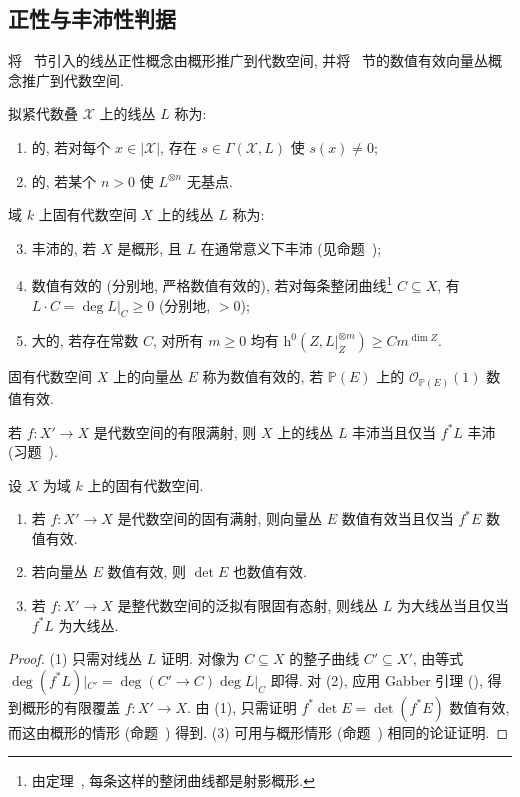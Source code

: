 \subsection{正性与丰沛性判据}\label{src:6.9.2-subsection}
将~ 节引入的线丛正性概念由概形推广到代数空间, 并将~ 节的数值有效向量丛概念推广到代数空间.
\begin{definition}\label{src:6.9.7}
拟紧代数叠 $\mathcal X$ 上的线丛 $L$ 称为:
\begin{enumerate}[(1)]
\item {}的, 若对每个 $x\in|\mathcal X|$, 存在 $s\in\Gamma(\mathcal X,\allowbreak L)$ 使 $s(x)\ne0$;
\item {}的, 若某个 $n>0$ 使 $L^{\otimes n}$ 无基点.
\end{enumerate}
域 $k$ 上固有代数空间 $X$ 上的线丛 $L$ 称为:
\begin{enumerate}[(1)]\setcounter{enumi}{2}
\item 丰沛的, 若 $X$ 是概形, 且 $L$ 在通常意义下丰沛 (见命题~);
\item 数值有效的 (分别地, 严格数值有效的), 若对每条整闭曲线\footnote{由定理~, 每条这样的整闭曲线都是射影概形.} $C\subseteq X$, 有 $L\cdot C=\deg L|_C\geq0$ (分别地, $>0$);
\item 大的, 若存在常数 $C$, 对所有 $m\geq0$ 均有 $\mathrm h^0(Z,\allowbreak L|_Z^{\otimes m})\geq Cm^{\dim Z}$.
\end{enumerate}
固有代数空间 $X$ 上的向量丛 $E$ 称为数值有效的, 若 $\mathbb P(E)$ 上的 $\mathcal O_{\mathbb P(E)}(1)$ 数值有效.
\end{definition}
若 $f:X'\to\allowbreak X$ 是代数空间的有限满射, 则 $X$ 上的线丛 $L$ 丰沛当且仅当 $f^*L$ 丰沛 (习题~).
\begin{lemma}\label{src:6.9.8}
设 $X$ 为域 $k$ 上的固有代数空间.
\begin{enumerate}[(1)]
\item 若 $f:X'\to\allowbreak X$ 是代数空间的固有满射, 则向量丛 $E$ 数值有效当且仅当 $f^*E$ 数值有效.
\item 若向量丛 $E$ 数值有效, 则 $\det E$ 也数值有效.
\item 若 $f:X'\to\allowbreak X$ 是整代数空间的泛拟有限固有态射, 则线丛 $L$ 为大线丛当且仅当 $f^*L$ 为大线丛.
\end{enumerate}
\end{lemma}
\begin{proof}
(1) 只需对线丛 $L$ 证明. 对像为 $C\subseteq X$ 的整子曲线 $C'\subseteq X'$, 由等式 $\deg(f^*L)|_{C'}=\deg(C'\to\allowbreak C)\deg L|_C$ 即得. 对 (2), 应用 Gabber 引理 (), 得到概形的有限覆盖 $f:X'\to\allowbreak X$. 由 (1), 只需证明 $f^*\det E=\det(f^*E)$ 数值有效, 而这由概形的情形 (命题~) 得到. (3) 可用与概形情形 (命题~) 相同的论证证明.
\end{proof}
